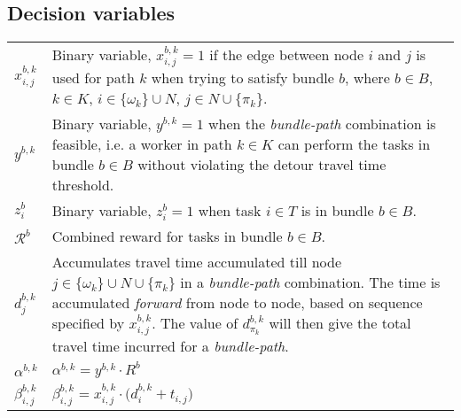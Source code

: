 \documentclass{article}
\begin{document}
\begin{multicols}{2}
\vfill\null

\columnbreak

\section{Decision variables}
\renewcommand{\arraystretch}{1.5}
\begin{supertabular}{L{0.58cm} L{7.2cm}}

	$x_{i,j}^{b,k}$ & Binary variable, $x_{i,j}^{b,k}=1$ if the edge between node $i$ and $j$ is used for path $k$ when trying to satisfy bundle $b$, where $b \in B$, $k \in K$, $i \in \{ \omega_k \} \cup N$, $j \in N \cup \{ \pi_k \}$. \\
	$y^{b,k}$ & Binary variable, $y^{b,k}=1$ when the \textit{bundle-path} combination is feasible, i.e. a worker in path $k \in K$ can perform the tasks in bundle $b \in B$ without violating the detour travel time threshold. \\
	$z_{i}^b$ & Binary variable, $z_i ^b=1$ when task $i \in T$ is in bundle $b \in B$. \\
	$\mathcal{R}^b$ & Combined reward for tasks in bundle $b \in B$. \\
	$d_{j}^{b, k}$ & Accumulates travel time accumulated till node $j \in \{ \omega_{k} \} \cup N \cup \{\pi_{k} \}$ in a \textit{bundle-path} combination. The time is accumulated \textit{forward} from node to node, based on sequence specified by $x_{i, j}^{b, k}$. The value of $d_{\pi_k}^{b, k}$ will then give the total travel time incurred for a \textit{bundle-path}. \\
	$\alpha^{b,k}$ & $\alpha^{b,k} = y^{b,k} \cdot R^b$ \\
	$\beta^{b,k}_{i,j}$ & $\beta^{b,k}_{i,j} = x^{b,k}_{i,j} \cdot \big(d^{b,k}_{i} + t_{i,j}\big)$ \\

\end{supertabular}
\end{multicols}
\end{document}
